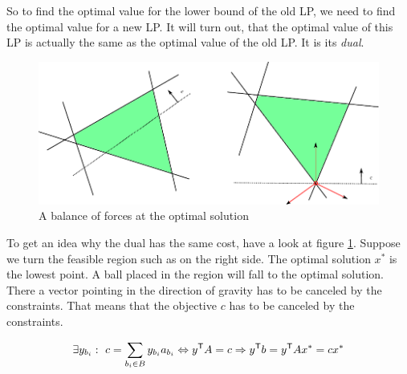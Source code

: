 So to find the optimal value for the lower bound of the old LP, we need to find the optimal value for a new LP. It will turn out, that the optimal value of this LP is actually the same as the optimal value of the old LP. It is its \emph{dual}.

\begin{figure}[hbt]
\begin{center}
\includegraphics{./images/dual.pdf}
\end{center}
\caption{A balance of forces at the optimal solution}
\label{Fig:ballsOfSteel}
\end{figure}

To get an idea why the dual has the same cost, have a look at figure \ref{Fig:ballsOfSteel}. Suppose we turn the feasible region such as on the right side. The optimal solution $x^*$ is the lowest point. A ball placed in the region will fall to the optimal solution. There a vector pointing in the direction of gravity has to be canceled by the constraints. That means that the objective $c$ has to be canceled by the constraints.

\[\exists y_{b_i}:\ c = \sum_{b_i\in B} y_{b_i} a_{b_i} \Leftrightarrow {y}^\text{\upshape \sffamily T} A=c \Rightarrow {y}^\text{\upshape \sffamily T} b = {y}^\text{\upshape \sffamily T} A x^* = cx^*\]


